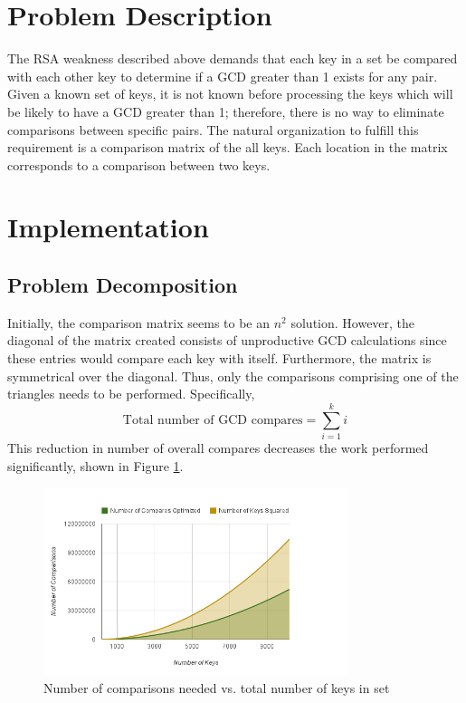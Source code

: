 \documentclass[12pt]{ucthesis}
\begin{document}
\section{Problem Description}
The RSA weakness described above demands that each key in a set be 
compared with each other key to determine if a GCD greater than 1 exists for 
any pair. Given a known set of keys, it is not known before processing 
the keys which will be likely to have a GCD greater than 1; therefore, there 
is no way to eliminate comparisons between specific pairs. The natural 
organization to fulfill this requirement is a comparison matrix of the all 
keys. Each location in the matrix corresponds to a comparison between two 
keys.

\section{Implementation}
\subsection{Problem Decomposition}
Initially, the comparison matrix seems to be an $n^2$ solution. However, the 
diagonal of the matrix created consists of unproductive GCD calculations since 
these entries would compare each key with itself. Furthermore, the matrix is 
symmetrical over the diagonal. Thus, only the comparisons comprising one of 
the triangles needs to be performed. Specifically, 
\begin{equation}
   \label{eq:gcd}
   \mbox{Total number of GCD compares} = \sum_{i=1}^k i
\end{equation}
This reduction in number of overall compares decreases the work 
performed significantly, shown in Figure \ref{fig:compvkeys}. 

\begin{figure}
   \centering
   \includegraphics[width=3.5in]{chart_6.png}
   \caption{Number of comparisons needed vs. total number of keys in set}
   \label{fig:compvkeys}
\end{figure}
\end{document}
